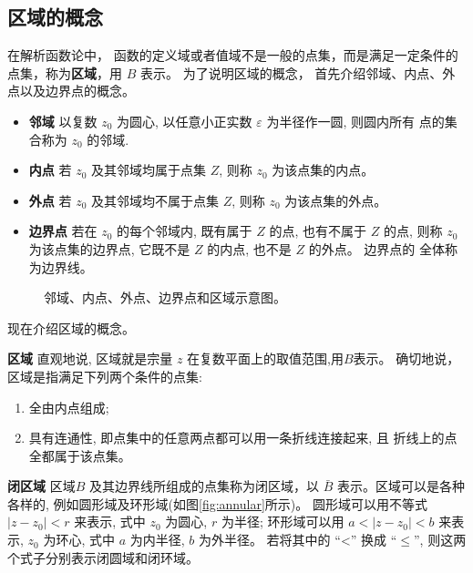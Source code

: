 



\subsection{区域的概念}
\label{sub:domain}
在解析函数论中， 函数的定义域或者值域不是一般的点集，而是满足一定条件的点集，称为{\bf 区域}，用 $B$ 表示。
为了说明区域的概念， 首先介绍邻域、内点、外点以及边界点的概念。

\begin{itemize}
\item {\bf 邻域} \quad 以复数 $z_0$ 为圆心, 以任意小正实数 $\varepsilon$ 为半径作一圆, 则圆内所有 点的集合称为 $z_0$ 的邻域.
\item {\bf 内点} \quad 若 $z_0$ 及其邻域均属于点集 $Z$, 则称 $z_0$ 为该点集的内点。
\item {\bf 外点} \quad 若 $z_0$ 及其邻域均不属于点集 $Z$, 则称 $z_0$ 为该点集的外点。
\item {\bf 边界点}  \quad 若在 $z_0$ 的每个邻域内, 既有属于 $Z$ 的点, 也有不属于 $Z$ 的点, 
        则称 $z_0$ 为该点集的边界点, 它既不是 $Z$ 的内点, 也不是 $Z$ 的外点。 边界点的 全体称为边界线。
\end{itemize}

\begin{figure}
    \centering
    
    \caption{邻域、内点、外点、边界点和区域示意图。}
    \label{fig:region}
\end{figure}

现在介绍区域的概念。 

\textbf{区域} \quad 直观地说,  区域就是宗量 $z$ 在复数平面上的取值范围,用$B$表示。 
确切地说，区域是指满足下列两个条件的点集:
    \begin{enumerate}
        \item 全由内点组成;
        \item 具有连通性, 即点集中的任意两点都可以用一条折线连接起来, 且 折线上的点全都属于该点集。
    \end{enumerate}

\textbf{闭区域} \quad 区域$B$ 及其边界线所组成的点集称为闭区域，以 $\bar{B}$ 表示。区域可以是各种各样的, 例如圆形域及环形域(如图\ref{fig:annular}所示)。 
圆形域可以用不等式 $\left|z-z_0\right|<r$ 来表示, 式中 $z_0$ 为圆心, $r$ 为半径; 
环形域可以用 $a<\left|z-z_0\right|<b$ 来表示, $z_0$ 为环心, 式中 $a$ 为内半径, $b$ 为外半径。
 若将其中的 “<” 换成 $“ \leqslant ”$, 则这两个式子分别表示闭圆域和闭环域。

